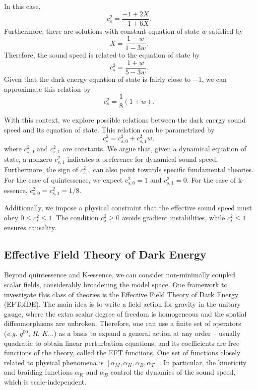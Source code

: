 \documentclass{article}
\begin{document}
In this case, 
\begin{equation}
    c_s^2 = \frac{-1 + 2X}{-1 + 6X}.
\end{equation}
Furthermore, there are solutions with constant equation of state $w$ satisfied by
\begin{equation}
    X = \frac{1 - w}{1 - 3w}.
\end{equation}
Therefore, the sound speed is related to the equation of state by
\begin{equation}
    c_s^2 = \frac{1 + w}{5 - 3w}.
\end{equation}
Given that the dark energy equation of state is fairly close to $-1$, we can approximate this relation by
\begin{equation}
    c_s^2 = \frac{1}{8}(1 + w).
\end{equation}

With this context, we explore possible relations between the dark energy sound speed and its equation of state. This relation can be parametrized by
\begin{equation}
    c_s^2 = c_{s,0}^2 + c_{s,1}^2w,
\end{equation}
where $c_{s,0}^2$ and $c_{s,1}^2$ are constants. We argue that, given a dynamical equation of state, a nonzero $c_{s,1}^2$ indicates a preference for dynamical sound speed. Furthermore, the sign of $c_{s,1}^2$ can also point towards specific fundamental theories. For the case of quintessence, we expect $c_{s,0}^2 = 1$ and $c_{s,1}^2 = 0$. For the case of k-essence, $c_{s,0}^2 = c_{s,1}^2 = 1/8$.

Additionally, we impose a physical constraint that the effective sound speed must obey $0 \leq c_s^2 \leq 1$. The condition $c_s^2 \geq 0$ avoids gradient instabilities, while $c_s^2 \leq 1$ ensures causality.

\subsection{Effective Field Theory of Dark Energy}
Beyond quintessence and K-essence, we can consider non-minimally coupled scalar fields, considerably broadening the model space. One framework to investigate this class of theories is the Effective Field Theory of Dark Energy (EFTofDE). The main idea is to write a field action for gravity in the unitary gauge, where the extra scalar degree of freedom is homogeneous and the spatial diffeomorphisms are unbroken. Therefore, one can use a finite set of operators (\textit{e.g.} $g^{00}$, $R$, $K$...) as a basis to expand a general action at any order -- usually quadratic to obtain linear perturbation equations, and its coefficients are free functions of the theory, called the EFT functions. One set of functions closely related to physical phenomena is $[\alpha_M, \alpha_K, \alpha_B, \alpha_T]$. In particular, the kineticity and braiding functions $\alpha_K$ and $\alpha_B$ control the dynamics of the sound speed, which is scale-independent.



\end{document}
